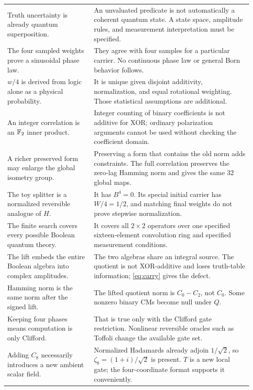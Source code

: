 \begin{longtable}{@{}L{0.31\textwidth}L{0.62\textwidth}@{}}
Truth uncertainty is already quantum superposition. & An unvaluated predicate is not automatically a coherent quantum state. A state space, amplitude rules, and measurement interpretation must be specified.\\
The four sampled weights prove a sinusoidal phase law. & They agree with four samples for a particular carrier. No continuous phase law or general Born behavior follows.\\
$w/4$ is derived from logic alone as a physical probability. & It is unique given disjoint additivity, normalization, and equal rotational weighting. Those statistical assumptions are additional.\\
An integer correlation is an $\mathbb F_2$ inner product. & Integer counting of binary coefficients is not additive for XOR; ordinary polarization arguments cannot be used without checking the coefficient domain.\\
A richer preserved form may enlarge the global isometry group. & Preserving a form that contains the old norm adds constraints. The full correlation preserves the zero-lag Hamming norm and gives the same $32$ global maps.\\
The toy splitter is a normalized reversible analogue of $H$. & It has $B^4=0$. Its special initial carrier has $W/4=1/2$, and matching final weights do not prove stepwise normalization.\\
The finite search covers every possible Boolean quantum theory. & It covers all $2\times2$ operators over one specified sixteen-element convolution ring and specified measurement conditions.\\
The lift embeds the entire Boolean algebra into complex amplitudes. & The two algebras share an integral source. The quotient is not XOR-additive and loses truth-table information; \cref{eq:carry} gives the defect.\\
Hamming norm is the same norm after the signed lift. & The lifted quotient norm is $C_0-C_2$, not $C_0$. Some nonzero binary CMs become null under $Q$.\\
Keeping four phases means computation is only Clifford. & That is true only with the Clifford gate restriction. Nonlinear reversible oracles such as Toffoli change the available gate set.\\
Adding $C_8$ necessarily introduces a new ambient scalar field. & Normalized Hadamards already adjoin $1/\sqrt2$, so $\zeta_8=(1+i)/\sqrt2$ is present. $T$ is a new local gate; the four-coordinate format supports it conveniently.\\

\end{longtable}
